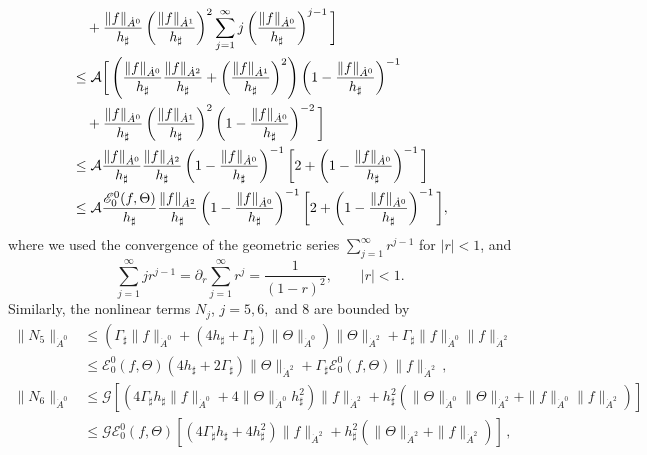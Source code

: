 \documentclass[reqno,11pt]{amsart}
\newcommand{\bh}{h_\sharp}
\newcommand{\bG}{\Gamma_\sharp}
\begin{document}
{\begin{align*}
&\quad +\frac{\|f\|_{\dot A^0}}{\bh}\left(\frac{\|f\|_{\dot{A}^1}}{\bh}\right)^2\sum_{j=1}^\infty j\left(\frac{\|f\|_{\dot A^0}}{\bh}\right)^{j-1} \bigg{]}\\
&\leq\mathcal{A} \bigg{[}\left(\frac{\|f\|_{\dot A^0}}{\bh}\frac{\|f\|_{\dot{A}^2}}{\bh} +\left(\frac{\|f\|_{\dot{A}^1}}{\bh}\right)^2\right)\left(1-\frac{\|f\|_{\dot A^0}}{\bh}\right)^{-1}\\
&\quad+\frac{\|f\|_{\dot A^0}}{\bh}\left(\frac{\|f\|_{\dot{A}^1}}{\bh}\right)^2\left(1-\frac{\|f\|_{\dot A^0}}{\bh}\right)^{-2} \bigg{]}\\
&\leq\mathcal{A} \frac{\|f\|_{\dot A^0}}{\bh}\frac{\|f\|_{\dot{A}^2}}{\bh}\left(1-\frac{\|f\|_{\dot A^0}}{\bh}\right)^{-1}\bigg{[}2+\left(1-\frac{\|f\|_{\dot A^0}}{\bh}\right)^{-1} \bigg{]}\\
&\leq \mathcal{A} \frac{\mathscr{E}_0^0(f,\Theta)}{\bh}\frac{\|f\|_{\dot{A}^2}}{\bh}\left(1-\frac{\|f\|_{\dot A^0}}{\bh}\right)^{-1}\bigg{[}2+\left(1-\frac{\|f\|_{\dot A^0}}{\bh}\right)^{-1} \bigg{]} ,
\end{align*}
where we used the convergence of the geometric series $\sum_{j=1}^\infty r^{j-1}$ for $|r|<1$, and
\[
	\sum_{j=1}^\infty jr^{j-1}=\partial_r \sum_{j=1}^{\infty}r^j = \frac{1}{(1-r)^2},\qquad |r|<1.
\]
Similarly,
the nonlinear terms $N_j$, $j=5,6,$ and $8$ are bounded by
\begin{align*}
\|N_5\|_{\dot A^0}
&\leq \left(\bG\|f\|_{\dot A^0}+\left(4\bh+\bG\right)\|\Theta\|_{\dot A^0} \right)\|\Theta\|_{\dot{A}^2}+ \bG\|f\|_{\dot A^0}\|f\|_{\dot{A}^2}\\
&\leq \mathscr{E}_0^0(f,\Theta)\left(4\bh+2\bG \right)\|\Theta\|_{\dot{A}^2}+ \bG\mathscr{E}_0^0(f,\Theta)\|f\|_{\dot{A}^2}\,,\end{align*}
\begin{align*}
\|N_6\|_{\dot A^0}&\leq\mathcal{G}\left[\left(4\bG\bh \|f\|_{\dot A^0}+4\|\Theta\|_{\dot A^0}\bh^2\right)\|f\|_{\dot{A}^2}+\bh^2\left(\|\Theta\|_{\dot A^0}\|\Theta\|_{\dot{A}^2}+\|f\|_{\dot A^0}\|f\|_{\dot{A}^2}\right)\right]\\
&\leq \mathcal{G}\mathscr{E}_0^0(f,\Theta)\left[\left(4\bG\bh +4\bh^2\right)\|f\|_{\dot{A}^2}+\bh^2\left(\|\Theta\|_{\dot{A}^2}+\|f\|_{\dot{A}^2}\right)\right]\,,
\end{align*}
}
\end{document}
